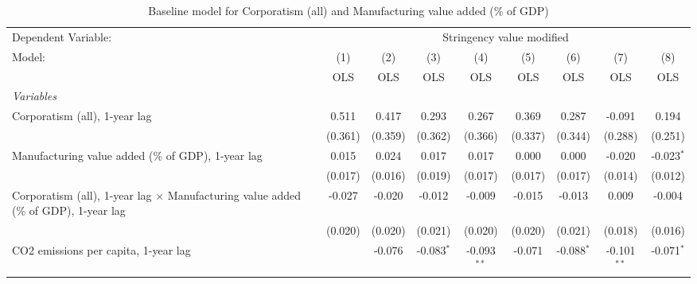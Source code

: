 
\begin{table}[htbp]
   \caption{Baseline model for Corporatism (all) and Manufacturing value added (\% of GDP)}
   \centering
   \begin{tabular}{lcccccccc}
      \toprule
      Dependent Variable: & \multicolumn{8}{c}{Stringency value modified}\\
      Model:                                                                                     & (1)     & (2)     & (3)          & (4)           & (5)           & (6)           & (7)           & (8)\\  
                                                                                                 &  OLS    & OLS     & OLS          & OLS           & OLS           & OLS           & OLS           & OLS\\  
      \midrule
      \emph{Variables}\\
      Corporatism (all), 1-year lag                                                              & 0.511   & 0.417   & 0.293        & 0.267         & 0.369         & 0.287         & -0.091        & 0.194\\   
                                                                                                 & (0.361) & (0.359) & (0.362)      & (0.366)       & (0.337)       & (0.344)       & (0.288)       & (0.251)\\   
      Manufacturing value added (\% of GDP), 1-year lag                                          & 0.015   & 0.024   & 0.017        & 0.017         & 0.000         & 0.000         & -0.020        & -0.023$^{*}$\\   
                                                                                                 & (0.017) & (0.016) & (0.019)      & (0.017)       & (0.017)       & (0.017)       & (0.014)       & (0.012)\\   
      Corporatism (all), 1-year lag $\times$ Manufacturing value added (\% of GDP), 1-year lag   & -0.027  & -0.020  & -0.012       & -0.009        & -0.015        & -0.013        & 0.009         & -0.004\\   
                                                                                                 & (0.020) & (0.020) & (0.021)      & (0.020)       & (0.020)       & (0.021)       & (0.018)       & (0.016)\\   
      CO2 emissions per capita, 1-year lag                                                       &         & -0.076  & -0.083$^{*}$ & -0.093$^{**}$ & -0.071        & -0.088$^{*}$  & -0.101$^{**}$ & -0.071$^{*}$\\   

\end{tabular}
\end{table}
